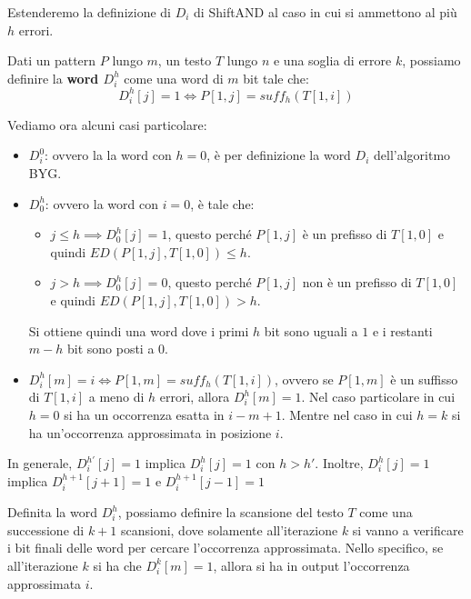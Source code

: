 Estenderemo la definizione di $D_i$ di ShiftAND al caso in cui si ammettono al più $h$ errori.
\begin{definizione}
    Dati un pattern $P$ lungo $m$, un testo $T$ lungo $n$ e una soglia di errore $k$,
    possiamo definire la \textbf{word $D_i^h$} come una word di $m$ bit tale che:
    \begin{equation}
        D_i^h[j] = 1 \iff P[1, j] = suff_h(T[1, i])
    \end{equation}
\end{definizione}
Vediamo ora alcuni casi particolare:
\begin{itemize}
    \item $D_i^0$: ovvero la la word con $h = 0$, è per definizione la word $D_i$
          dell'algoritmo BYG.
    \item $D_0^h$: ovvero la word con $i = 0$, è tale che:
          \begin{itemize}
              \item $j \leq h \implies D_0^h[j] = 1$, questo perché $P[1, j]$ è un
                    prefisso di $T[1, 0]$ e quindi $ED(P[1, j], T[1, 0]) \leq h$.
              \item $j > h \implies D_0^h[j] = 0$, questo perché $P[1, j]$ non è un
                    prefisso di $T[1, 0]$ e quindi $ED(P[1, j], T[1, 0]) > h$.
          \end{itemize}
          Si ottiene quindi una word dove i primi $h$ bit sono uguali a $1$ e i
          restanti $m - h$ bit sono posti a $0$.
    \item $D_i^h [m] = i \iff P[1, m] = suff_h(T[1, i])$, ovvero se $P[1, m]$ è un
          suffisso di $T[1, i]$ a meno di $h$ errori, allora $D_i^h[m] = 1$. Nel
          caso particolare in cui $h = 0$ si ha un occorrenza esatta in $i - m + 1$.
          Mentre nel caso in cui $h = k$ si ha un'occorrenza approssimata in posizione $i$.
\end{itemize}
\begin{nota}
    In generale, $D_i^{h'}[j] = 1$ implica $D_i^{h}[j] = 1$ con $h > h'$. Inoltre,
    $D_{i}^{h} [j] = 1$ implica $D_{i}^{h + 1}[j + 1] = 1$ e $D_{i}^{h + 1}[j - 1] = 1$
\end{nota}
Definita la word $D_i^h$, possiamo definire la scansione del testo $T$ come una
successione di $k + 1$ scansioni, dove solamente all'iterazione $k$ si vanno a
verificare i bit finali delle word per cercare l'occorrenza approssimata.
Nello specifico, se all'iterazione $k$ si ha che $D_i^k[m] = 1$, allora si ha in
output l'occorrenza approssimata $i$.

